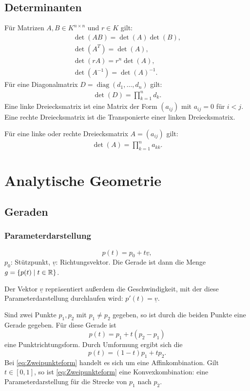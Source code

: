 \subsection{Determinanten}
Für Matrizen $A,B\in K^{n\times n}$ und $r\in K$ gilt:
\begin{gather}
\det(AB) = \det(A)\det(B),\\
\det(A^T) = \det(A),\\
\det(rA) = r^n\det(A),\\
\det(A^{-1}) = \det(A)^{-1}.
\end{gather}
Für eine Diagonalmatrix $D=\operatorname{diag}(d_1,\ldots,d_n)$ gilt:
\begin{gather}
\det(D) = \prod_{k=1}^n d_k.
\end{gather}
Eine linke Dreiecksmatrix ist eine Matrix der Form
$(a_{ij})$ mit $a_{ij}=0$ für $i<j$. Eine rechte
Dreiecksmatrix ist die Transponierte einer linken
Dreiecksmatrix.

Für eine linke oder rechte Dreiecksmatrix $A=(a_{ij})$ gilt:
\begin{gather}
\det(A) = \prod_{k=1}^n a_{kk}.
\end{gather}

\section{Analytische Geometrie}
\subsection{Geraden}
\subsubsection{Parameterdarstellung}

\begin{equation}
p(t) = p_0+t\underline v,
\end{equation}
$p_0$: Stützpunkt, $\underline v$: Richtungsvektor.
Die Gerade ist dann die Menge $g=\{p(t)\mid t\in\mathbb R\}$.

Der Vektor $\underline v$ repräsentiert außerdem die Geschwindigkeit,
mit der diese Parameterdarstellung durchlaufen wird:
$p'(t)=\underline v$.

Sind zwei Punkte $p_1,p_2$ mit $p_1\ne p_2$ gegeben, so ist
durch die beiden Punkte eine Gerade gegeben. Für diese Gerade ist
\begin{equation}
p(t) = p_1+t(p_2-p_1)
\end{equation}
eine Punktrichtungsform.
Durch Umformung ergibt sich die 
\begin{equation}\label{eq:Zweipunkteform}
p(t) = (1-t)p_1+tp_2.
\end{equation}
Bei \eqref{eq:Zweipunkteform} handelt es sich um eine
Affinkombination. Gilt $t\in[0,1]$, so ist \eqref{eq:Zweipunkteform}
eine Konvexkombination: eine Parameterdarstellung für die Strecke
von $p_1$ nach $p_2$.

